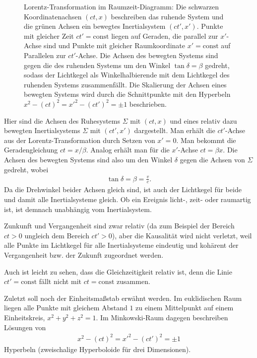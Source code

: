 \begin{figure}[htp]
    \centering
    \tfigMinkowskiDiagramB
    \caption{Lorentz-Transformation im Raumzeit-Diagramm: Die schwarzen Koordinatenachsen $(ct,x)$ beschreiben das ruhende System und die grünen Achsen ein bewegtes Inertialsystem $(ct',x')$.
    Punkte mit gleicher Zeit $ct'=\mathrm{const}$ liegen auf Geraden, die parallel zur $x'$-Achse sind und Punkte mit gleicher Raumkoordinate $x'=\mathrm{const}$ auf Parallelen zur $ct'$-Achse.
    Die Achsen des bewegten Systems sind gegen die des ruhenden Systems um den Winkel $\tan\delta=\beta$ gedreht, sodass der Lichtkegel als Winkelhalbierende mit dem Lichtkegel des ruhenden Systems zusammenfällt.
    Die Skalierung der Achsen eines bewegten Systems wird durch die Schnittpunkte mit den Hyperbeln $x^2-(ct)^2={x'}^2-(ct')^2=\pm1$ beschrieben. }
    \label{fig:minkowski_diagramB}
\end{figure}

Hier sind die Achsen des Ruhesystems $\Sigma$ mit $(ct,x)$ und eines relativ dazu bewegten Inertialsystems $\Sigma$ mit $(ct',x')$ dargestellt.
Man erhält die $ct'$-Achse aus der Lorentz-Transformation durch Setzen von $x'=0$. Man bekommt die Geradengleichung $ct=x/\beta$.
Analog erhält man für die $x'$-Achse $ct=\beta x$.
Die Achsen des bewegten Systems sind also um den Winkel $\delta$ gegen die Achsen von $\Sigma$ gedreht, wobei
\begin{align*}
    \tan\delta=\beta=\frac{v}{c}.
\end{align*}
Da die Drehwinkel beider Achsen gleich sind, ist auch der Lichtkegel für beide und damit alle Inertialsysteme gleich.
Ob ein Ereignis licht-, zeit- oder raumartig ist, ist demnach unabhängig vom Inertialsystem.

Zunkunft und Vergangenheit sind zwar relativ (da zum Beispiel der Bereich $ct>0$ ungleich dem Bereich $ct'>0$), aber die Kausalität wird nicht verletzt,
weil alle Punkte im Lichtkegel für alle Inertialsysteme eindeutig und kohärent der Vergangenheit bzw. der Zukunft zugeordnet werden.

Auch ist leicht zu sehen, dass die Gleichzeitigkeit relativ ist, denn die Linie $ct'=\mathrm{const}$ fällt nicht mit $ct=\mathrm{const}$ zusammen.

Zuletzt soll noch der Einheitsmaßstab erwähnt werden.
Im euklidischen Raum liegen alle Punkte mit gleichem Abstand $1$ zu einem Mittelpunkt auf einem Einheitskreis, $x^2+y^2+z^2=1$.
Im Minkowski-Raum dagegen beschreiben Lösungen von
\begin{align*}
    x^2-(ct)^2={x'}^2-(ct')^2=\pm1
\end{align*}
Hyperbeln (zweischalige Hyperboloide für drei Dimensionen).



